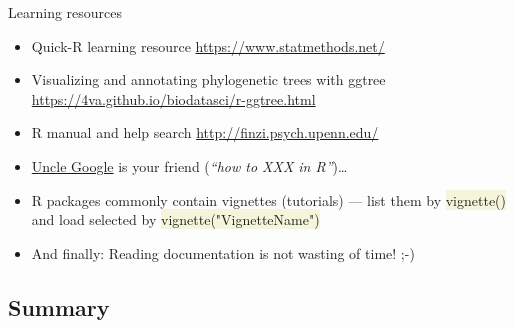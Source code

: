 \documentclass[compress, ucs, xelatex, 11pt, xcolor=svgnames, aspectratio=169,
	hyperref={
		bookmarks=true,
		unicode=true,
		colorlinks=true,
		pdftitle={Molecular data in R},
		plainpages=false,
		pdfauthor={Vojtech Zeisek},
		pdfsubject={Course about phylogeny and evolution in R},
		pdfcreator={XeLaTeX},
		pdfkeywords={R, evolution, phylogeny, molecular data},
		linkcolor=Crimson, %
		anchorcolor=Magenta, %
		citecolor=Magenta, %
		filecolor=Magenta, %
		menucolor=Magenta, %
		urlcolor=DodgerBlue, %
		pdftex},
	url={hyphens, lowtilde} %
	]{beamer}
\renewcommand{\texttt}[1]{\colorbox{Beige}{{\ttfamily #1}}}
\begin{document}
\begin{frame}[allowframebreaks]{Learning resources}
\begin{itemize}
		\item Quick-R learning resource \url{https://www.statmethods.net/}
		\item Visualizing and annotating phylogenetic trees with ggtree \url{https://4va.github.io/biodatasci/r-ggtree.html}
		\item R manual and help search \url{http://finzi.psych.upenn.edu/}
		\item \href{http://rseek.org/}{Uncle Google} is your friend (\textit{\enquote{how to XXX in R}})\ldots
		\item R packages commonly contain vignettes (tutorials) --- list them by \texttt{vignette()} and load selected by \texttt{vignette("VignetteName")}
		\item And finally: \alert{Reading documentation is not wasting of time!} ;-)
	\end{itemize}
\end{frame}

\subsection{Summary}
\end{document}
